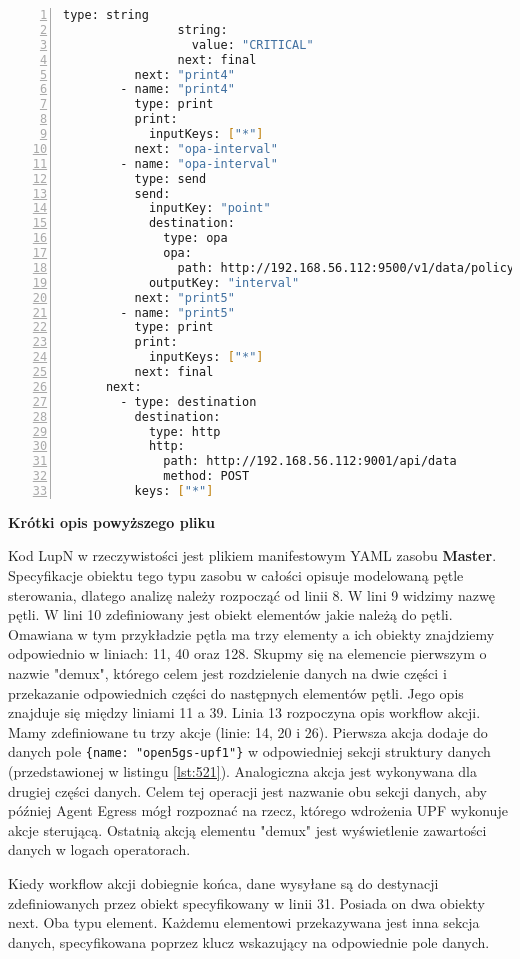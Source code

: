 \begin{lstlisting}[language=sh, caption={\emph{Kod LupN}}, label={lst:a101}, numbers=left, stepnumber=1]
                type: string
                string: 
                  value: "CRITICAL"
                next: final
          next: "print4"
        - name: "print4"
          type: print
          print:
            inputKeys: ["*"]
          next: "opa-interval"
        - name: "opa-interval"
          type: send
          send: 
            inputKey: "point"
            destination: 
              type: opa
              opa: 
                path: http://192.168.56.112:9500/v1/data/policy/interval
            outputKey: "interval"
          next: "print5"
        - name: "print5"
          type: print
          print:
            inputKeys: ["*"]
          next: final
      next: 
        - type: destination
          destination: 
            type: http
            http: 
              path: http://192.168.56.112:9001/api/data
              method: POST
          keys: ["*"]
\end{lstlisting}


\textbf{Krótki opis powyższego pliku}

Kod LupN w rzeczywistości jest plikiem manifestowym YAML zasobu \textbf{Master}. Specyfikacje obiektu tego typu zasobu w całości opisuje modelowaną pętle sterowania, dlatego analizę należy rozpocząć od linii 8. W lini 9 widzimy nazwę pętli. W lini 10 zdefiniowany jest obiekt elementów jakie należą do pętli. Omawiana w tym przykładzie pętla ma trzy elementy a ich obiekty znajdziemy odpowiednio w liniach: 11, 40 oraz 128. Skupmy się na elemencie pierwszym o nazwie "demux", którego celem jest rozdzielenie danych na dwie części i przekazanie odpowiednich części do następnych elementów pętli. Jego opis znajduje się między liniami 11 a 39. Linia 13 rozpoczyna opis workflow akcji. Mamy zdefiniowane tu trzy akcje (linie: 14, 20 i 26). Pierwsza akcja dodaje do danych pole \texttt{\{name: "open5gs-upf1"\}} w odpowiedniej sekcji struktury danych (przedstawionej w listingu \ref{lst:521}). Analogiczna akcja jest wykonywana dla drugiej części danych. Celem tej operacji jest nazwanie obu sekcji danych, aby później Agent Egress mógł rozpoznać na rzecz, którego wdrożenia UPF wykonuje akcje sterującą. Ostatnią akcją elementu "demux" jest wyświetlenie zawartości danych w logach operatorach. 

Kiedy workflow akcji dobiegnie końca, dane wysyłane są do destynacji zdefiniowanych przez obiekt specyfikowany w linii 31. Posiada on dwa obiekty next. Oba typu element. Każdemu elementowi przekazywana jest inna sekcja danych, specyfikowana poprzez klucz wskazujący na odpowiednie pole danych.

